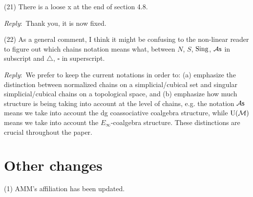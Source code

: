 \documentclass{amsart}
\newcommand{\ar}{\medskip\noindent\textit{Reply}:\ }
\newcommand{\rp}{\medskip\noindent}
\begin{document}
	\rp (21) There is a loose x at the end of section 4.8.

	\ar Thank you, it is now fixed.

	\rp (22) As a general comment, I think it might be confusing to the non-linear reader to figure out which chains notation means what, between $N$, $S$, $\operatorname{Sing}$, ${\mathcal{A}\mathsf{s}}$ in subscript and $\triangle$, $\square$ in superscript.

    \ar We prefer to keep the current notations in order to:
    (a) emphasize the distinction between normalized chains on a simplicial/cubical set and singular simplicial/cubical chains on a topological space, and (b) emphasize how much structure is being taking into account at the level of chains, e.g. the notation ${\mathcal{A}\mathsf{s}}$ means we take into account the dg coassociative coalgebra structure, while ${\operatorname{U}(\mathcal{M})}$ means we take into account the $E_{\infty}$-coalgebra structure.
    These distinctions are crucial throughout the paper.

	\section{Other changes}

	\noindent (1) AMM's affiliation has been updated.

	\sloppy
	\printbibliography
\end{document}
